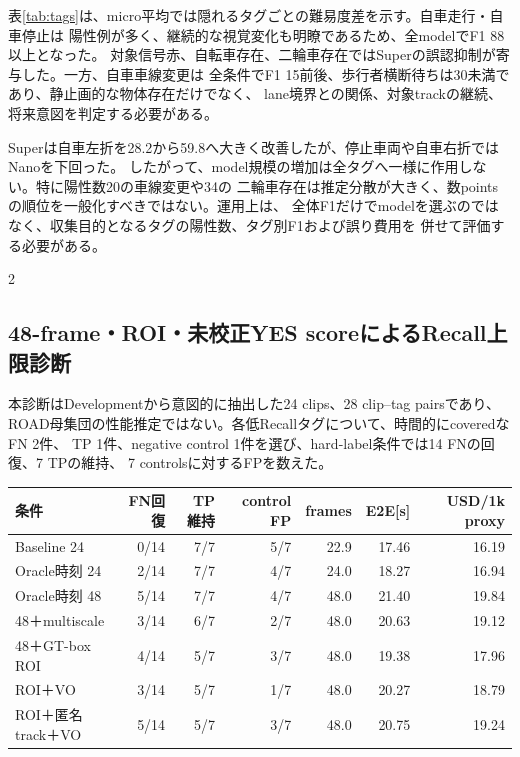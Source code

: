 \documentclass[9pt,a4paper]{extarticle}
\begin{document}
表\ref{tab:tags}は、micro平均では隠れるタグごとの難易度差を示す。自車走行・自車停止は
陽性例が多く、継続的な視覚変化も明瞭であるため、全modelでF1 88以上となった。
対象信号赤、自転車存在、二輪車存在ではSuperの誤認抑制が寄与した。一方、自車車線変更は
全条件でF1 15前後、歩行者横断待ちは30未満であり、静止画的な物体存在だけでなく、
lane境界との関係、対象trackの継続、将来意図を判定する必要がある。

Superは自車左折を28.2から59.8へ大きく改善したが、停止車両や自車右折ではNanoを下回った。
したがって、model規模の増加は全タグへ一様に作用しない。特に陽性数20の車線変更や34の
二輪車存在は推定分散が大きく、数pointsの順位を一般化すべきではない。運用上は、
全体F1だけでmodelを選ぶのではなく、収集目的となるタグの陽性数、タグ別F1および誤り費用を
併せて評価する必要がある。
\begin{multicols}{2}

\subsection{48-frame・ROI・未校正YES scoreによるRecall上限診断}
本診断はDevelopmentから意図的に抽出した24 clips、28 clip--tag pairsであり、
ROAD母集団の性能推定ではない。各低Recallタグについて、時間的にcoveredなFN 2件、
TP 1件、negative control 1件を選び、hard-label条件では14 FNの回復、7 TPの維持、
7 controlsに対するFPを数えた。
\end{multicols}
\begin{center}
\label{tab:recall-diagnostic}
\scriptsize
\begin{tabular}{lrrrrrr}
\toprule
条件 & FN回復 & TP維持 & control FP & frames & E2E[s] & USD/1k proxy\\
\midrule
Baseline 24 & 0/14 & 7/7 & 5/7 & 22.9 & 17.46 & 16.19 \\
Oracle時刻 24 & 2/14 & 7/7 & 4/7 & 24.0 & 18.27 & 16.94 \\
Oracle時刻 48 & 5/14 & 7/7 & 4/7 & 48.0 & 21.40 & 19.84 \\
48＋multiscale & 3/14 & 6/7 & 2/7 & 48.0 & 20.63 & 19.12 \\
48＋GT-box ROI & 4/14 & 5/7 & 3/7 & 48.0 & 19.38 & 17.96 \\
ROI＋VO & 3/14 & 5/7 & 1/7 & 48.0 & 20.27 & 18.79 \\
ROI＋匿名track＋VO & 5/14 & 5/7 & 3/7 & 48.0 & 20.75 & 19.24 \\
\bottomrule
\end{tabular}
\end{center}
\end{document}
